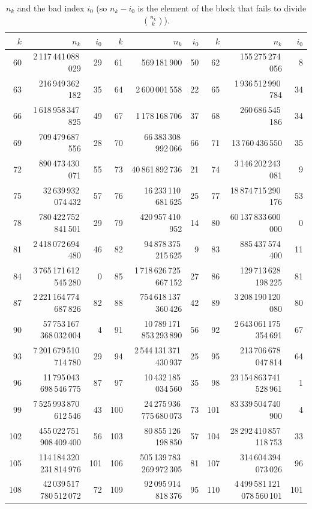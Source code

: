\documentclass[11pt]{amsart}
\theoremstyle{remark}
\begin{document}
\begin{table}[h]
\caption{$n_k$ and the bad index $i_0$ (so $n_k-i_0$ is the element of the block that fails to divide $\binom{n_k}{k}$).}\label{tab:values}
\footnotesize
\begin{tabular}{rrr@{\quad}rrr@{\quad}rrr}
\toprule
$k$ & $n_k$ & $i_0$ & $k$ & $n_k$ & $i_0$ & $k$ & $n_k$ & $i_0$\\
\midrule
60 & 2\,117\,441\,088\,029 & 29 & 61 & 569\,181\,900 & 50 & 62 & 155\,275\,274\,056 & 8 \\
63 & 216\,949\,362\,182 & 35 & 64 & 2\,600\,001\,558 & 22 & 65 & 1\,936\,512\,990\,784 & 34 \\
66 & 1\,618\,958\,347\,825 & 49 & 67 & 1\,178\,168\,706 & 37 & 68 & 260\,686\,545\,186 & 34 \\
69 & 709\,479\,687\,556 & 28 & 70 & 66\,383\,308\,992\,066 & 66 & 71 & 13\,760\,436\,550 & 35 \\
72 & 890\,473\,430\,071 & 55 & 73 & 40\,861\,892\,736 & 21 & 74 & 3\,146\,202\,243\,081 & 9 \\
75 & 32\,639\,932\,074\,432 & 57 & 76 & 16\,233\,110\,681\,625 & 25 & 77 & 18\,874\,715\,290\,176 & 53 \\
78 & 780\,422\,752\,841\,501 & 29 & 79 & 420\,957\,410\,952 & 14 & 80 & 60\,137\,833\,600\,000 & 0 \\
81 & 2\,418\,072\,694\,480 & 46 & 82 & 94\,878\,375\,215\,625 & 9 & 83 & 885\,437\,574\,400 & 11 \\
84 & 3\,765\,171\,612\,545\,280 & 0 & 85 & 1\,718\,626\,725\,667\,152 & 27 & 86 & 129\,713\,628\,198\,225 & 81 \\
87 & 2\,221\,164\,774\,687\,826 & 82 & 88 & 754\,618\,137\,360\,426 & 42 & 89 & 3\,208\,190\,120\,080 & 80 \\
90 & 57\,753\,167\,368\,032\,004 & 4 & 91 & 10\,789\,171\,853\,293\,890 & 56 & 92 & 2\,643\,061\,175\,354\,691 & 67 \\
93 & 7\,201\,679\,510\,714\,780 & 29 & 94 & 2\,544\,131\,371\,430\,937 & 25 & 95 & 213\,706\,678\,047\,814 & 64 \\
96 & 11\,795\,043\,698\,546\,775 & 87 & 97 & 10\,432\,185\,034\,560 & 35 & 98 & 23\,154\,863\,741\,528\,961 & 1 \\
99 & 7\,525\,993\,870\,612\,546 & 43 & 100 & 24\,275\,936\,775\,680\,073 & 73 & 101 & 83\,339\,504\,740\,900 & 4 \\
102 & 455\,022\,751\,908\,409\,400 & 56 & 103 & 80\,855\,126\,198\,850 & 57 & 104 & 28\,292\,410\,857\,118\,753 & 33 \\
105 & 114\,184\,320\,231\,814\,976 & 101 & 106 & 505\,139\,783\,269\,972\,305 & 81 & 107 & 314\,604\,394\,073\,026 & 96 \\
108 & 42\,039\,517\,780\,512\,072 & 72 & 109 & 92\,095\,914\,818\,376 & 95 & 110 & 4\,499\,581\,121\,078\,560\,101 & 101 \\
\bottomrule
\end{tabular}
\end{table}
\end{document}
